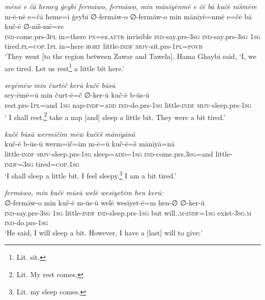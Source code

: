\ea \label{BP.181}
\textit{mēnē e čā ħemey ġeybī fermāwo, fermāwo, min mānīyēnmē e čē bā kučē nīšmēre} \\ 
\gll m-ē-nē e=čā ħeme=ī ġeybī ∅-fermāw-o ∅-fermāw-o min mānīyē=nmē e=čē bā kuč-ē ∅-nīš-mē=re \\ 
 \textsc{ind-}come.prs\textsc{-3pl} in=there \textsc{pn}=ez.\textsc{attr} invisible \textsc{ind-}say.prs\textsc{-3sg} \textsc{ind-}say.prs\textsc{-3sg} \textsc{1sg} tired\textsc{.pl}\textsc{=cop}\textsc{.\textsc{1pl}} in=here \textsc{hort} little\textsc{-indf} \textsc{sbjv-}sit.prs\textsc{-\textsc{1pl}}\textsc{=\textsc{povb}} \\ 
\glt `They went [to the region between Zawar and Tawela]. Hama Ghaybi said, ‘I, we are tired. Let us rest\footnote{Lit. sit.} a little bit here.'
\z 
 
\ea \label{BP.182}
\textit{seyēmēw min čurtēč kerū kučē būsū} \\ 
\gll sey-ēmē=ū min čurt-ē=č ∅-ker-ū kuč-ē b-ūs-ū \\ 
 rest.prs-\textsc{1pl}=and \textsc{1sg} nap\textsc{-indf}\textsc{=add} \textsc{ind-}do.prs\textsc{-\textsc{1sg}} little\textsc{-indf} \textsc{sbjv-}sleep.prs\textsc{-\textsc{1sg}} \\ 
\glt ` I shall rest,\footnote{Lit. My rest comes.} take a nap [and] sleep a little bit. They were a bit tired.'
\z 
 
\ea \label{BP.183}
\textit{kučē būsū wermīčim mēw kučēš mānīyānā} \\ 
\gll kuč-ē b-ūs-ū werm=īč=im m-ē=ū kuč-ē=š mānīyā=nā \\ 
 little\textsc{-indf} \textsc{sbjv-}sleep.prs\textsc{-\textsc{1sg}} sleep\textsc{=add}\textsc{=\textsc{1sg}} \textsc{ind-}come.prs\textsc{.3sg}=and little\textsc{-indf}\textsc{=3sg} tired\textsc{=cop}\textsc{.\textsc{1sg}} \\ 
\glt `I shall sleep a little bit. I feel sleepy.\footnote{Lit. my sleep comes.} I am a bit tired.'
\z 
 
\ea \label{BP.184}
\textit{fermāwo, min kučē mūsū welē wesīyetēm hen kerū:} \\ 
\gll ∅-fermāw-o min kuč-ē m-ūs-ū welē wesīyet-ē=m hen-∅ ∅-ker-ū \\ 
 \textsc{ind-}say.prs\textsc{-3sg} \textsc{1sg} little\textsc{-indf} \textsc{ind-}sleep.prs\textsc{-\textsc{1sg}} but will.\textsc{.m}\textsc{-indf}\textsc{=\textsc{1sg}} exist\textsc{-3sg}\textsc{.m} \textsc{ind-}do.prs\textsc{-\textsc{1sg}} \\ 
\glt `He said, I will sleep a bit. However, I have a [last] will to give:'
\z 
 

